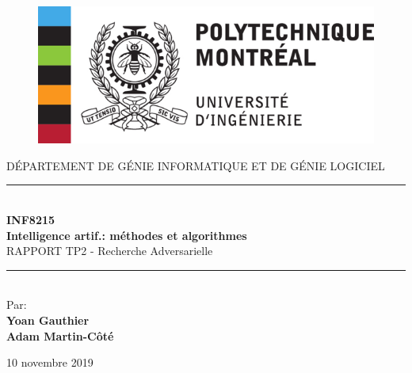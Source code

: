 \begin{titlepage}

    \newcommand{\HRule}{\rule{\linewidth}{0.5mm}}
    \center

    \begin{figure}[h]
        \includegraphics[scale=1,center]{poly.png}
    \end{figure}

    \small{DÉPARTEMENT DE GÉNIE INFORMATIQUE ET DE GÉNIE LOGICIEL} \\[2cm]

    \HRule \\[0.5cm]
    \huge{\bfseries INF8215}\\
    \huge{\bfseries Intelligence artif.: méthodes et algorithmes}\\[0.3cm]
    \large{RAPPORT TP2 - Recherche Adversarielle}\\[0.2cm]
    \HRule \\[1.8cm]

    Par:\\
    \large \textbf{Yoan Gauthier}\\
    \large \textbf{Adam Martin-Côté}
    \vfill

    10 novembre 2019

\end{titlepage}

